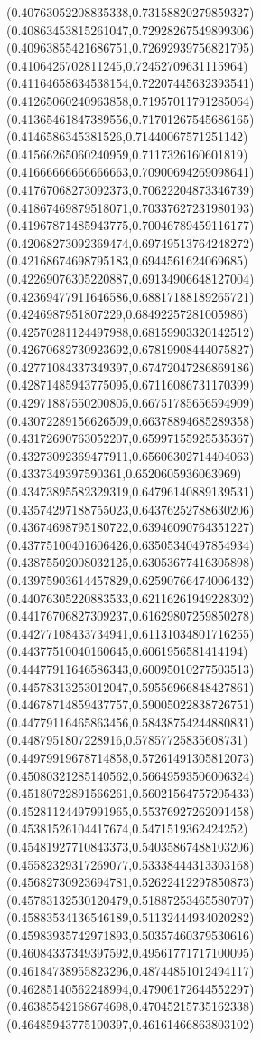 \documentclass[12pt]{article}
\theoremstyle{plain}
\theoremstyle{definition}
\theoremstyle{remark}
\begin{document}
\begin{figure}
{  (0.40763052208835338,0.73158820279859327)%
  (0.40863453815261047,0.72928267549899306)%
  (0.40963855421686751,0.72692939756821795)%
  (0.4106425702811245,0.72452709631115964)%
  (0.41164658634538154,0.72207445632393541)%
  (0.41265060240963858,0.71957011791285064)%
  (0.41365461847389556,0.71701267545686165)%
  (0.4146586345381526,0.71440067571251142)%
  (0.41566265060240959,0.7117326160601819)%
  (0.41666666666666663,0.70900694269098641)%
  (0.41767068273092373,0.70622204873346739)%
  (0.41867469879518071,0.70337627231980193)%
  (0.41967871485943775,0.70046789459116177)%
  (0.42068273092369474,0.69749513764248272)%
  (0.42168674698795183,0.6944561624069685)%
  (0.42269076305220887,0.69134906648127004)%
  (0.42369477911646586,0.68817188189265721)%
  (0.4246987951807229,0.68492257281005986)%
  (0.42570281124497988,0.68159903320142512)%
  (0.42670682730923692,0.67819908444075827)%
  (0.42771084337349397,0.67472047286869186)%
  (0.42871485943775095,0.67116086731170399)%
  (0.42971887550200805,0.66751785656594909)%
  (0.43072289156626509,0.66378894685289358)%
  (0.43172690763052207,0.65997155925535367)%
  (0.43273092369477911,0.65606302714404063)%
  (0.4337349397590361,0.6520605936063969)%
  (0.43473895582329319,0.64796140889139531)%
  (0.43574297188755023,0.64376252788630206)%
  (0.43674698795180722,0.63946090764351227)%
  (0.43775100401606426,0.63505340497854934)%
  (0.43875502008032125,0.63053677416305898)%
  (0.43975903614457829,0.62590766474006432)%
  (0.44076305220883533,0.62116261949228302)%
  (0.44176706827309237,0.61629807259850278)%
  (0.44277108433734941,0.61131034801716255)%
  (0.44377510040160645,0.6061956581414194)%
  (0.44477911646586343,0.60095010277503513)%
  (0.44578313253012047,0.59556966848427861)%
  (0.44678714859437757,0.59005022838726751)%
  (0.44779116465863456,0.58438754244880831)%
  (0.4487951807228916,0.57857725835608731)%
  (0.44979919678714858,0.57261491305812073)%
  (0.45080321285140562,0.56649593506006324)%
  (0.45180722891566261,0.56021564757205433)%
  (0.45281124497991965,0.55376927262091458)%
  (0.45381526104417674,0.5471519362424252)%
  (0.45481927710843373,0.54035867488103206)%
  (0.45582329317269077,0.53338444313303168)%
  (0.45682730923694781,0.52622412297850873)%
  (0.45783132530120479,0.51887253465580707)%
  (0.45883534136546189,0.51132444934020282)%
  (0.45983935742971893,0.50357460379530616)%
  (0.46084337349397592,0.49561771717100095)%
  (0.46184738955823296,0.48744851012494117)%
  (0.46285140562248994,0.47906172644552297)%
  (0.46385542168674698,0.47045215735162338)%
  (0.46485943775100397,0.46161466863803102)%
}
\end{figure}
\end{document}
